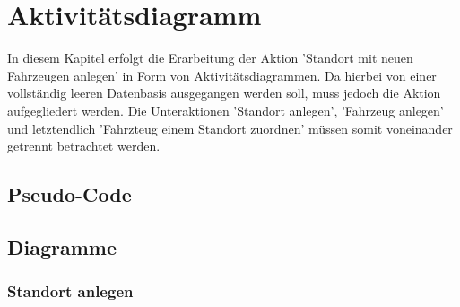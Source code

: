 \chapter{Aktivitätsdiagramm}

In diesem Kapitel erfolgt die Erarbeitung der Aktion 'Standort mit neuen Fahrzeugen anlegen' in Form von Aktivitätsdiagrammen. Da hierbei von einer vollständig leeren Datenbasis ausgegangen werden soll, muss jedoch die Aktion aufgegliedert werden. Die Unteraktionen 'Standort anlegen', 'Fahrzeug anlegen' und letztendlich 'Fahrzteug einem Standort zuordnen' müssen somit voneinander getrennt betrachtet werden. 

\section{Pseudo-Code}



\section{Diagramme}

\newpage

\subsection{Standort anlegen}

